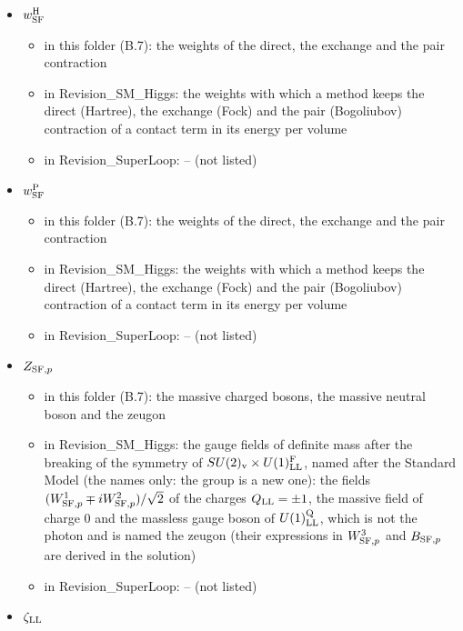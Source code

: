 \documentclass[
  10pt,
]{article}
\providecommand{\tightlist}{%
  \setlength{\itemsep}{0pt}\setlength{\parskip}{0pt}}
\begin{document}
\begin{itemize}
  \begin{itemize}
  \tightlist
  \item
    in this folder (B.7): the weights of the direct, the exchange and
    the pair contraction
  \item
    in Revision\_SM\_Higgs: the weights with which a method keeps the
    direct (Hartree), the exchange (Fock) and the pair (Bogoliubov)
    contraction of a contact term in its energy per volume
  \item
    in Revision\_SuperLoop: -- (not listed)
  \end{itemize}
\item
  \(w^{\rm H}_{\rm SF}\)

  \begin{itemize}
  \tightlist
  \item
    in this folder (B.7): the weights of the direct, the exchange and
    the pair contraction
  \item
    in Revision\_SM\_Higgs: the weights with which a method keeps the
    direct (Hartree), the exchange (Fock) and the pair (Bogoliubov)
    contraction of a contact term in its energy per volume
  \item
    in Revision\_SuperLoop: -- (not listed)
  \end{itemize}
\item
  \(w^{\rm P}_{\rm SF}\)

  \begin{itemize}
  \tightlist
  \item
    in this folder (B.7): the weights of the direct, the exchange and
    the pair contraction
  \item
    in Revision\_SM\_Higgs: the weights with which a method keeps the
    direct (Hartree), the exchange (Fock) and the pair (Bogoliubov)
    contraction of a contact term in its energy per volume
  \item
    in Revision\_SuperLoop: -- (not listed)
  \end{itemize}
\item
  \(Z_{{\rm SF},p}\)

  \begin{itemize}
  \tightlist
  \item
    in this folder (B.7): the massive charged bosons, the massive
    neutral boson and the zeugon
  \item
    in Revision\_SM\_Higgs: the gauge fields of definite mass after the
    breaking of the symmetry of
    \(SU(2)_{\rm v}\times U(1)^{\rm F}_{\rm LL}\), named after the
    Standard Model (the names only: the group is a new one): the fields
    \((W^1_{{\rm SF},p}\mp iW^2_{{\rm SF},p})/\sqrt2\) of the charges
    \(Q_{\rm LL}=\pm1\), the massive field of charge 0 and the massless
    gauge boson of \(U(1)^{\rm Q}_{\rm LL}\), which is not the photon
    and is named the zeugon (their expressions in \(W^3_{{\rm SF},p}\)
    and \(B_{{\rm SF},p}\) are derived in the solution)
  \item
    in Revision\_SuperLoop: -- (not listed)
  \end{itemize}
\item
  \(\zeta_{\rm LL}\)


\end{itemize}
\end{document}
